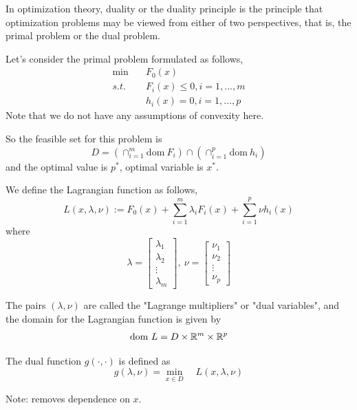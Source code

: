 
In optimization theory, duality or the duality principle is the principle that optimization problems may be viewed from either of two perspectives, that is, the primal problem or the dual problem.

Let's consider the primal problem formulated as follows,
\begin{align*}
	\min \quad&F_0(x) \\
	s.t. \quad&F_i(x)\leq 0, i = 1,...,m\\
	&h_i(x)= 0, i = 1,...,p
\end{align*}
Note that we do not have any assumptions of convexity here.

So the feasible set for this problem is
$$D = (\cap^m_{i=1}\text{dom}\ F_i)\cap(\cap^p_{i=1}\text{dom}\ h_i)$$ 
and the optimal value is $p^*$, optimal variable is $x^*$.

\begin{definition}
	We define the Lagrangian function as follows,
	$$L(x,\lambda,\nu) := F_0(x) + \sum^m_{i=1}\lambda_i F_i(x) + \sum^p_{i=1}\nu h_i(x)$$
	where
	$$\lambda =
	\begin{bmatrix}
	\lambda_1\\
	\lambda_2\\
	\vdots\\
	\lambda_m
	\end{bmatrix},\
	\nu = 
	\begin{bmatrix}
	\nu_1\\
	\nu_2\\
	\vdots\\
	\nu_p
	\end{bmatrix}$$
	
	The pairs $(\lambda, \nu)$ are called the "Lagrange multipliers" or "dual variables", and the domain for the Lagrangian function is given by 
	$$\text{dom}\ L = D\times \mathbb{R}^m \times \mathbb{R}^p$$
\end{definition}

\begin{definition}
	The dual function $g(\cdot, \cdot)$ is defined as 
	\begin{equation*}
		g(\lambda, \nu) = \min_{x\in D}\quad L(x,\lambda,\nu)
	\end{equation*}
	
	Note: removes dependence on $x$.
\end{definition}


